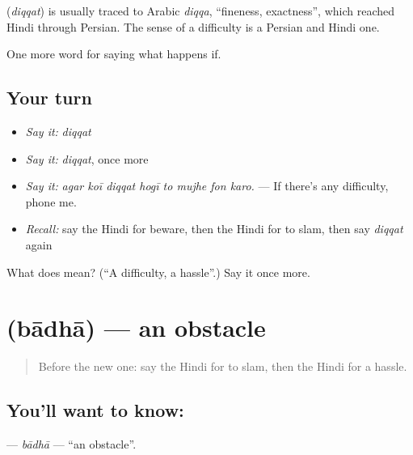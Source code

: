\begin{cousinweb}
\textbf{} (\emph{diqqat}) is usually traced to Arabic \emph{diqqa}, \textquotedblleft{}fineness, exactness\textquotedblright{}, which reached Hindi through Persian. The sense of a difficulty is a Persian and Hindi one.
\end{cousinweb}

\begin{grammarlens}[title={What you've built}]
One more word for saying what happens if.
\end{grammarlens}

\subsection*{Your turn}
\begin{itemize}
\raggedright
  \item \emph{Say it:} \emph{diqqat}
  \item \emph{Say it:} \emph{diqqat}, once more
  \item \emph{Say it:} \emph{agar koī diqqat hogī to mujhe fon karo.} — If there's any difficulty, phone me.
  \item \emph{Recall:} say the Hindi for beware, then the Hindi for to slam, then say \emph{diqqat} again
\end{itemize}

\begin{tcolorbox}[breakable,colback=teal!4,colframe=teal!35!black,title={Before you move on}]
What does  mean? (\textquotedblleft{}A difficulty, a hassle\textquotedblright{}.) Say it once more.
\end{tcolorbox}
\section[\texorpdfstring{\hi{बाधा} (bādhā)}{बाधा (bādhā)}]{ (bādhā) — an obstacle}

\label{lesson:HI-C380-badha}



\begin{quote}
Before the new one: say the Hindi for to slam, then the Hindi for a hassle.
\end{quote}

\subsection*{You'll want to know: }
\textbf{} — \emph{bādhā} — \textquotedblleft{}an obstacle\textquotedblright{}.

